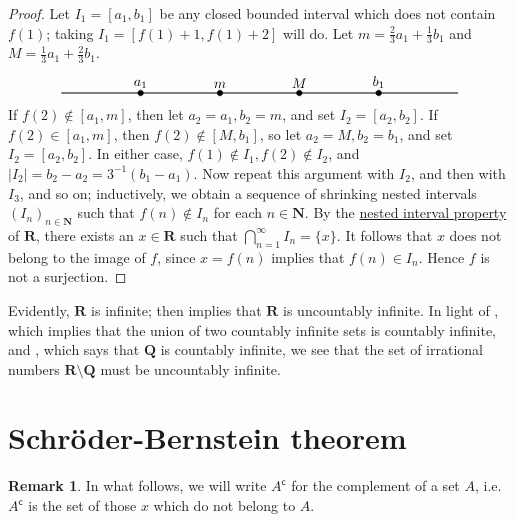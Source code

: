 \documentclass[12pt]{article}
\theoremstyle{definition}
\newtheorem*{remark}{Remark}
\newcommand{\setcomp}[1]{#1^{\mathsf{c}}}
\newcommand{\N}{\mathbf{N}}
\newcommand{\Q}{\mathbf{Q}}
\newcommand{\R}{\mathbf{R}}
\begin{document}
\begin{proof}
    Let \( I_1 = [a_1, b_1] \) be any closed bounded interval which does not contain \( f(1) \); taking \( I_1 = [f(1) + 1, f(1) + 2] \) will do. Let \( m = \frac{2}{3}a_1 + \frac{1}{3}b_1 \) and \( M = \frac{1}{3}a_1 + \frac{2}{3} b_1 \).
    \[
    \begin{tikzpicture}
        \draw[black, thick] (0, 0) -- (10, 0);
        \filldraw[black] (2, 0) circle (2pt) node[anchor=south]{$a_1$};
        \filldraw[black] (4, 0) circle (2pt) node[anchor=south]{$m$};
        \filldraw[black] (6, 0) circle (2pt) node[anchor=south]{$M$};
        \filldraw[black] (8, 0) circle (2pt) node[anchor=south]{$b_1$};
    \end{tikzpicture}
    \]
    If \( f(2) \not\in [a_1, m] \), then let \( a_2 = a_1, b_2 = m \), and set \( I_2 = [a_2, b_2] \). If \( f(2) \in [a_1, m] \), then \( f(2) \not\in [M, b_1] \), so let \( a_2 = M, b_2 = b_1 \), and set \( I_2 = [a_2, b_2] \). In either case, \( f(1) \not\in I_1, f(2) \not\in I_2 \), and \( |I_2| = b_2 - a_2 = 3^{-1}(b_1 - a_1) \). Now repeat this argument with \( I_2 \), and then with \( I_3 \), and so on; inductively, we obtain a sequence of shrinking nested intervals \( (I_n)_{n \in \N} \) such that \( f(n) \not\in I_n \) for each \( n \in \N \). By the \href{https://lew98.github.io/Mathematics/Nested_interval_property.pdf}{nested interval property} of \( \R \), there exists an \( x \in \R \) such that \( \bigcap_{n=1}^{\infty} I_n = \{ x \} \). It follows that \( x \) does not belong to the image of \( f \), since \( x = f(n) \) implies that \( f(n) \in I_n \). Hence \( f \) is not a surjection.
\end{proof}

Evidently, \( \R \) is infinite;  then implies that \( \R \) is uncountably infinite. In light of , which implies that the union of two countably infinite sets is countably infinite, and , which says that \( \Q \) is countably infinite, we see that the set of irrational numbers \( \R \setminus \Q \) must be uncountably infinite.

\section{Schröder-Bernstein theorem}
\label{sec:schroder-bernstein_theorem}

\begin{remark}
    In what follows, we will write \( \setcomp{A} \) for the complement of a set \( A \), i.e.\ \( \setcomp{A} \) is the set of those \( x \) which do not belong to \( A \).
\end{remark}
\end{document}
